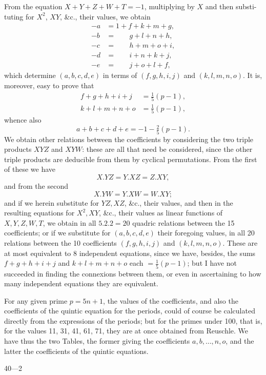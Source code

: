 \documentclass[11pt]{article}
\begin{document}
From the equation $X + Y + Z + W + T = -1$, multiplying by $X$ and then substi-tuting
for $X^2$, $XY$, \&c., their values, we obtain
\begin{align*}
-a &= 1 + f + k + m + g, \\
-b &= \phantom{1 +\,} g + l + n + h, \\
-c &= \phantom{1 +\,} h + m + o + i, \\
-d &= \phantom{1 +\,} i + n + k + j, \\
-e &= \phantom{1 +\,} j + o + l + f,
\end{align*}
which determine $(a, b, c, d, e)$ in terms of $(f, g, h, i, j)$ and $(k, l, m, n, o)$. It is,
moreover, easy to prove that
\begin{align*}
f + g + h + i + j &= \tfrac{1}{5}(p - 1), \\
k + l + m + n + o &= \tfrac{1}{5}(p - 1),
\end{align*}
whence also
\[
a + b + c + d + e = -1 - \tfrac{2}{5}(p - 1).
\]
We obtain other relations between the coefficients by considering the two triple
products $XYZ$ and $XYW$: these are all that need be considered, since the other
triple products are deducible from them by cyclical permutations. From the first of
these we have
\[
X.YZ = Y.XZ = Z.XY,
\]
and from the second
\[
X.YW = Y.XW = W.XY;
\]
and if we herein substitute for $YZ, XZ$, \&c., their values, and then in the resulting
equations for $X^2, XY$, \&c., their values as linear functions of $X, Y, Z, W, T$, we
obtain in all $5.2.2 = 20$ quadric relations between the 15 coefficients; or if we
substitute for $(a, b, c, d, e)$ their foregoing values, in all 20 relations between the 10
coefficients $(f, g, h, i, j)$ and $(k, l, m, n, o)$. These are at most equivalent to 8
independent equations, since we have, besides, the sums $f+g+h+i+j$ and $k+l+m+n+o$
each $= \tfrac{1}{5}(p - 1)$; but I have not succeeded in finding the connexions between them,
or even in ascertaining to how many independent equations they are equivalent.

For any given prime $p = 5n + 1$, the values of the coefficients, and also the
coefficients of the quintic equation for the periods, could of course be calculated
directly from the expressions of the periods; but for the primes under 100, that is,
for the values 11, 31, 41, 61, 71, they are at once obtained from Reuschle. We
have thus the two Tables, the former giving the coefficients $a, b, \ldots, n, o$, and the
latter the coefficients of the quintic equations.

\begin{center}{\small 40---2}\end{center}
\end{document}
